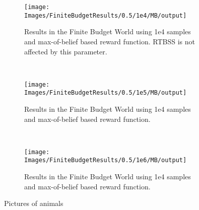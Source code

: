 \begin{figure}[h]
        \centering
        \begin{subfigure}[t]{0.3\textwidth}
                \texttt{[image: Images/FiniteBudgetResults/0.5/1e4/MB/output]}
                \caption{Results in the Finite Budget World using 1e4 samples and max-of-belief based
                reward function. RTBSS is not affected by this parameter.}
                \label{fig:m4m}
        \end{subfigure}%
        ~ %
        \begin{subfigure}[t]{0.3\textwidth}
                \texttt{[image: Images/FiniteBudgetResults/0.5/1e5/MB/output]}
                \caption{Results in the Finite Budget World using 1e4 samples and max-of-belief based
                reward function.}
                \label{fig:m5m}
        \end{subfigure}
        ~ %
        \begin{subfigure}[t]{0.3\textwidth}
                \texttt{[image: Images/FiniteBudgetResults/0.5/1e6/MB/output]}
                \caption{Results in the Finite Budget World using 1e4 samples and max-of-belief based
                reward function.}
                \label{fig:m6m}
        \end{subfigure}
        \caption{Pictures of animals}\label{fig:mm}
\end{figure}

